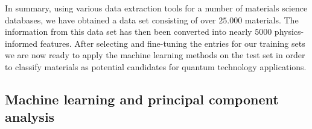 \documentclass[superscriptaddress,unsortedaddress,
 amsmath,amssymb,
 aps,
]{revtex4-2}
\begin{document}

In summary, using various data extraction tools for a number of materials science databases, we have obtained a data set consisting of over $25.000$ materials. The information from this data set has then been converted into nearly $5000$ physics-informed features.  
After selecting and fine-tuning the entries for our training sets we are now ready to apply the machine learning methods on the test set in order to classify materials as potential candidates for quantum technology applications. 

\subsection*{Machine learning and principal component analysis}    
\end{document}
